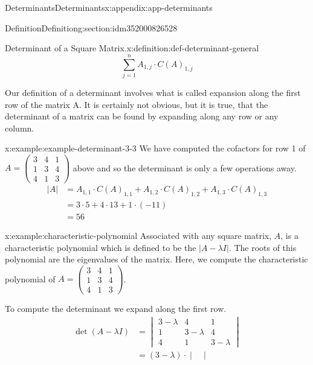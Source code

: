 \documentclass[oneside,10pt,]{book}
\begin{document}
\begin{appendixptx}{Determinants}{}{Determinants}{}{}{x:appendix:app-determinants}
\begin{sectionptx}{Definition}{}{Definition}{}{}{g:section:idm352000826528}
\begin{definition}{Determinant of a Square Matrix.}{x:definition:def-determinant-general}
\begin{equation*}
\sum_{j=1}^{n} A_{1,j}\cdot C(A)_{1,j} 
\end{equation*}
%
\end{definition}
Our definition of a determinant involves what is called expansion along the first row of the matrix A. It is certainly not obvious, but it is true, that the determinant of a matrix can be found by expanding along any row or any column.%
\begin{example}{}{x:example:example-determinant-3-3}%
We have computed the cofactors for row 1 of \(A = \begin{pmatrix}
3 & 4 & 1 \\
1 & 3 & 4 \\
4 & 1 & 3 
\end{pmatrix} \) above and so the determinant is only a few operations away.%
\begin{equation*}
\begin{split}
\lvert A \rvert &= A_{1,1}\cdot C(A)_{1,1} +A_{1,2}\cdot C(A)_{1,2}+A_{1,3}\cdot C(A)_{1,3}\\
&= 3\cdot 5 + 4\cdot 13 + 1 \cdot (-11)\\
&= 56
\end{split}
\end{equation*}
%
\end{example}
\begin{example}{}{x:example:characteristic-polynomial}%
%
Associated with any square matrix, \(A\), is a characteristic polynomial which is defined to be the \(\lvert A - \lambda I \rvert\).   The roots of this polynomial are the eigenvalues of the matrix. Here, we compute the characteristic polynomial of \(A = \begin{pmatrix}
3 & 4 & 1 \\
1 & 3 & 4 \\
4 & 1 & 3 
\end{pmatrix}\).%
\par
To compute the determinant we expand along the first row.%
\begin{equation*}
\begin{split}
\det{(A - \lambda I)} &=  \begin{vmatrix}
3 - \lambda & 4 & 1 \\
1 & 3 - \lambda & 4 \\
4 & 1 & 3 - \lambda 
\end{vmatrix}\\
&= (3-\lambda)\cdot  \begin{vmatrix}

\end{vmatrix}
\end{split}
\end{equation*}
\end{example}
\end{sectionptx}
\end{appendixptx}
\end{document}
